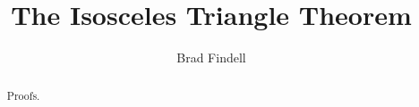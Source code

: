 \documentclass[nooutcomes]{ximera}
\title{The Isosceles Triangle Theorem}
\author{Brad Findell}
\begin{document}
\begin{abstract}
Proofs. 
\end{abstract}
\maketitle

%
%


\end{document}
